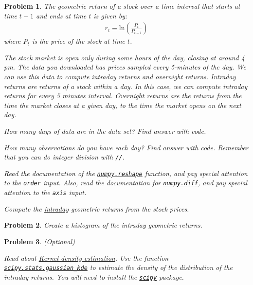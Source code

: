 \documentclass[12pt, a4paper]{article}
\renewcommand{\ln}[1]{\text{ln}\left(#1\right)}
\newtheorem{problem}{Problem}
\begin{document}
\begin{problem}
The geometric return of a stock over a time interval that starts at time \(t-1\) and ends at time \(t\) is given by:
\begin{align*}
r_t \equiv \ln{\frac{P_t}{P_{t-1}}}
\end{align*}
where \(P_t\) is the price of the stock at time \(t\).

The stock market is open only during some hours of the day, closing at around 4 pm.
The data you downloaded has prices sampled every 5-minutes of the day.
We can use this data to compute intraday returns and overnight returns.
Intraday returns are returns of a stock within a day.
In this case, we can compute intraday returns for every 5 minutes interval.
Overnight returns are the returns from the time the market closes at a given day, to the time the market opens on the next day.

How many days of data are in the data set? Find answer with code.

How many observations do you have each day? Find answer with code. Remember that you can do integer division with \texttt{//}.

Read the documentation of the \href{https://docs.scipy.org/doc/numpy/reference/generated/numpy.reshape.html}{\texttt{numpy.reshape}} function, and pay special attention to the \texttt{order} input.
Also, read the documentation for \href{https://docs.scipy.org/doc/numpy/reference/generated/numpy.diff.html}{\texttt{numpy.diff}}, and pay special attention to the \texttt{axis} input.

Compute the \uline{intraday} geometric returns from the stock prices.
\end{problem}

\begin{problem}
Create a histogram of the intraday geometric returns.
\end{problem}

\begin{problem}
(Optional)

Read about \href{https://en.wikipedia.org/wiki/Kernel\_density\_estimation}{Kernel density estimation}.
Use the function \href{https://docs.scipy.org/doc/scipy/reference/generated/scipy.stats.gaussian\_kde.html}{\texttt{scipy.stats.gaussian\_kde}} to estimate the density of the distribution of the intraday returns.
You will need to install the \href{https://docs.scipy.org/doc/scipy/reference/index.html}{\texttt{scipy}} package.
\end{problem}
\end{document}
